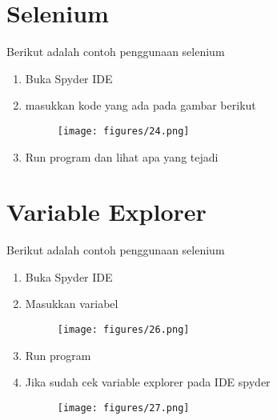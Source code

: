 \section{Selenium}
Berikut adalah contoh penggunaan selenium
\begin{enumerate}
\item Buka Spyder IDE
\item masukkan kode yang ada pada gambar berikut
\begin{figure}[H]
    \centering
    \texttt{[image: figures/24.png]}
    \label{24}
\end{figure}
\item Run program dan lihat apa yang tejadi
\end{enumerate}

\section{Variable Explorer}
Berikut adalah contoh penggunaan selenium
\begin{enumerate}
\item Buka Spyder IDE
\item Masukkan variabel
\begin{figure}[H]
    \centering
    \texttt{[image: figures/26.png]}
    \label{26}
\end{figure}
\item Run program
\item Jika sudah cek variable explorer pada IDE spyder
\begin{figure}[H]
    \centering
    \texttt{[image: figures/27.png]}
    \label{27}
\end{figure}
\end{enumerate}